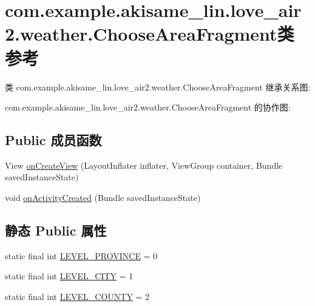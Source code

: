 \hypertarget{classcom_1_1example_1_1akisame__lin_1_1love__air2_1_1weather_1_1_choose_area_fragment}{}\section{com.\+example.\+akisame\+\_\+lin.\+love\+\_\+air2.\+weather.\+Choose\+Area\+Fragment类 参考}
\label{classcom_1_1example_1_1akisame__lin_1_1love__air2_1_1weather_1_1_choose_area_fragment}


类 com.\+example.\+akisame\+\_\+lin.\+love\+\_\+air2.\+weather.\+Choose\+Area\+Fragment 继承关系图\+:


com.\+example.\+akisame\+\_\+lin.\+love\+\_\+air2.\+weather.\+Choose\+Area\+Fragment 的协作图\+:
\subsection*{Public 成员函数}
\begin{DoxyCompactItemize}
\item 
View \mbox{\hyperlink{classcom_1_1example_1_1akisame__lin_1_1love__air2_1_1weather_1_1_choose_area_fragment_a191d1beec301d78606c4f084ee50cc78}{on\+Create\+View}} (Layout\+Inflater inflater, View\+Group container, Bundle saved\+Instance\+State)
\item 
void \mbox{\hyperlink{classcom_1_1example_1_1akisame__lin_1_1love__air2_1_1weather_1_1_choose_area_fragment_a1f2b548e77b99f652795ed8e72184f49}{on\+Activity\+Created}} (Bundle saved\+Instance\+State)
\end{DoxyCompactItemize}
\subsection*{静态 Public 属性}
\begin{DoxyCompactItemize}
\item 
static final int \mbox{\hyperlink{classcom_1_1example_1_1akisame__lin_1_1love__air2_1_1weather_1_1_choose_area_fragment_a59f53a3f22a55707d1873e4b5dc82a2a}{L\+E\+V\+E\+L\+\_\+\+P\+R\+O\+V\+I\+N\+CE}} = 0
\item 
static final int \mbox{\hyperlink{classcom_1_1example_1_1akisame__lin_1_1love__air2_1_1weather_1_1_choose_area_fragment_a48644de0aaa19a15c96f01ec0b099c00}{L\+E\+V\+E\+L\+\_\+\+C\+I\+TY}} = 1
\item 
static final int \mbox{\hyperlink{classcom_1_1example_1_1akisame__lin_1_1love__air2_1_1weather_1_1_choose_area_fragment_a4cb15ebbf7c7f6274131492cd3653640}{L\+E\+V\+E\+L\+\_\+\+C\+O\+U\+N\+TY}} = 2
\end{DoxyCompactItemize}
